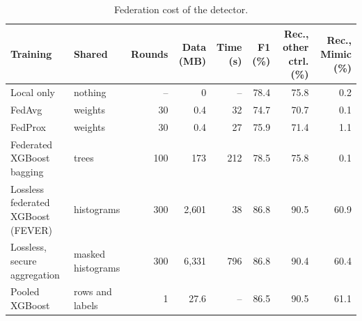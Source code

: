 \begin{table}[t]
\centering
\caption{Federation cost of the detector.}
\label{tab:fedcost}
\footnotesize\setlength{\tabcolsep}{4pt}
\begin{tabular}{llrrrrrr}
\toprule
Training & Shared & Rounds & Data (MB) & Time (s) & F1 (\%) & Rec., other ctrl. (\%) & Rec., Mimic (\%) \\
\midrule
Local only & nothing & -- & 0 & -- & 78.4 & 75.8 & 0.2 \\
FedAvg & weights & 30 & 0.4 & 32 & 74.7 & 70.7 & 0.1 \\
FedProx & weights & 30 & 0.4 & 27 & 75.9 & 71.4 & 1.1 \\
Federated XGBoost bagging & trees & 100 & 173 & 212 & 78.5 & 75.8 & 0.1 \\
Lossless federated XGBoost (FEVER) & histograms & 300 & 2{,}601 & 38 & 86.8 & 90.5 & 60.9 \\
Lossless, secure aggregation & masked histograms & 300 & 6{,}331 & 796 & 86.8 & 90.4 & 60.4 \\
Pooled XGBoost & rows and labels & 1 & 27.6 & -- & 86.5 & 90.5 & 61.1 \\
\bottomrule
\end{tabular}
\end{table}
